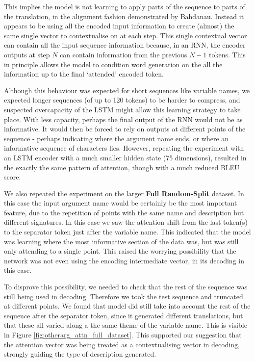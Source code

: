 This implies the model is not learning to apply parts of the sequence to parts of the translation, in the alignment fashion demonstrated by Bahdanau\cite{bahdanau_neural_2014}. Instead it appears to be using all the encoded input information to create (almost) the same single vector to contextualise on at each step.
This single contextual vector can contain all the input sequence information because, in an RNN, the encoder outputs at step $N$ can contain information from the previous $N-1$ tokens. This in principle allows the model to condition word generation on the all the information up to the final `attended' encoded token. 

Although this behaviour was expected for short sequences like variable names, we expected longer sequences (of up to 120 tokens) to be harder to compress, and suspected overcapacity of the LSTM might allow this learning strategy to take place. 
With less capacity, perhaps the final output of the RNN would not be as informative. It would then be forced to rely on outputs at different points of the sequence - perhaps indicating where the argument name ends, or where an informative sequence of characters lies.
However, repeating the experiment with an LSTM encoder with a much smaller hidden state (75 dimensions), resulted in the exactly the same pattern of attention, though with a much reduced BLEU score.

We also repeated the experiment on the larger \textbf{Full Random-Split} dataset. In this case the input argument name would be certainly be the most important feature, due to the repetition of points with the same name and description but different signatures. 
In this case we saw the attention shift from the last token(s) to the separator token just after the variable name. This indicated that the model was learning where the most informative section of the data was, but was still only attending to a single point.
This raised the worrying possibility that the network was not even using the encoding intermediate vector, in its decoding in this case.

To disprove this possibility, we needed to check that the rest of the sequence was still being used in decoding. Therefore we took the test sequence and truncated at different points. We found that model did still take into account the rest of the sequence after the separator token, since it generated different translations, but that these all varied along a the same theme of the variable name. This is visible in Figure \ref{fig:otherarg_attn_full_dataset}. This supported our suggestion that the attention vector was being treated as a contextualising vector in decoding, strongly guiding the type of description generated.


